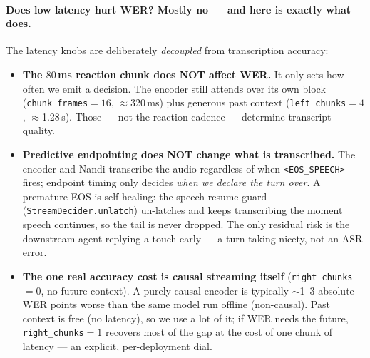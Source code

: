 \documentclass[11pt]{article}
\newcommand{\code}[1]{\texttt{#1}}
\newcommand{\flag}[1]{\texttt{<#1>}}
\begin{document}
\paragraph{Does low latency hurt WER? Mostly no --- and here is exactly what does.} The
latency knobs are deliberately \emph{decoupled} from transcription accuracy:
\begin{itemize}[leftmargin=1.4em,itemsep=1pt]
\item \textbf{The $80$\,ms reaction chunk does NOT affect WER.} It only sets how often we emit
a decision. The encoder still attends over its own block (\code{chunk\_frames}$=16$, $\approx$320\,ms)
plus generous past context (\code{left\_chunks}$=4$, $\approx$1.28\,s). Those --- not the reaction
cadence --- determine transcript quality.
\item \textbf{Predictive endpointing does NOT change what is transcribed.} The encoder and
Nandi transcribe the audio regardless of when \flag{EOS\_SPEECH} fires; endpoint timing only
decides \emph{when we declare the turn over}. A premature EOS is self-healing: the
speech-resume guard (\code{StreamDecider.unlatch}) un-latches and keeps transcribing the moment
speech continues, so the tail is never dropped. The only residual risk is the downstream agent
replying a touch early --- a turn-taking nicety, not an ASR error.
\item \textbf{The one real accuracy cost is causal streaming itself} (\code{right\_chunks}$=0$,
no future context). A purely causal encoder is typically $\sim$1--3 absolute WER points worse
than the same model run offline (non-causal). Past context is free (no latency), so we use a
lot of it; if WER needs the future, \code{right\_chunks}$=1$ recovers most of the gap at the
cost of one chunk of latency --- an explicit, per-deployment dial.
\end{itemize}
\end{document}
